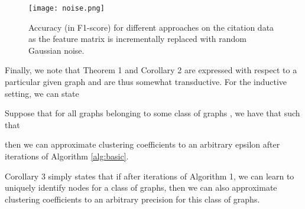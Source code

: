 \renewcommand{\thetheorem}{3}
\begin{figure}
\centering
\texttt{[image: noise.png]}
\caption{Accuracy (in F1-score) for different approaches on the citation data as the feature matrix is incrementally replaced with random Gaussian noise.}
\label{fig:noise}
\end{figure}

Finally, we note that Theorem 1 and Corollary 2 are expressed with respect to a particular given graph and are thus somewhat transductive.
For the inductive setting, we can state
\begin{corollary}
Suppose that for all graphs  belonging to some class of graphs , we have that  such that

then we can approximate clustering coefficients to an arbitrary epsilon after  iterations of Algorithm \ref{alg:basic}.
\end{corollary}
Corollary 3 simply states that if after  iterations of Algorithm 1, we can learn to uniquely identify nodes for a class of graphs, then we can also approximate clustering coefficients to an arbitrary precision for this class of graphs. 




